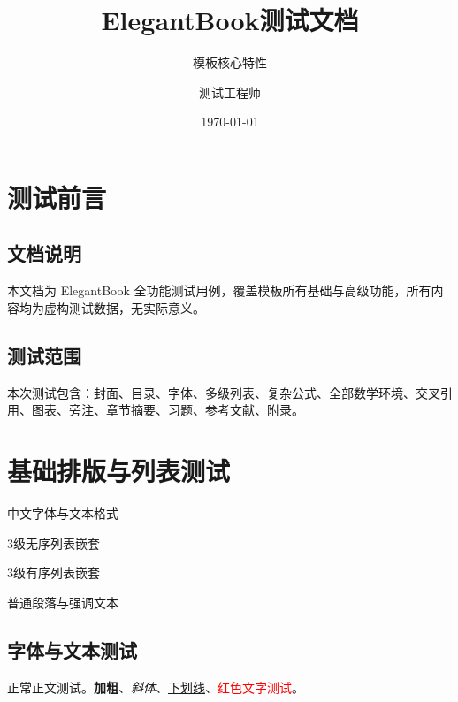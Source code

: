 \title{ElegantBook测试文档}
\subtitle{模板核心特性}
\author{测试工程师}
\date{\today}

\setcounter{tocdepth}{3} %





\maketitle
\frontmatter
\tableofcontents

\setcounter{page}{0}
\chapter*{测试前言}
\section*{文档说明}
本文档为 ElegantBook 全功能测试用例，覆盖模板所有基础与高级功能，所有内容均为虚构测试数据，无实际意义。
\newpage
\section*{测试范围}
本次测试包含：封面、目录、字体、多级列表、复杂公式、全部数学环境、交叉引用、图表、旁注、章节摘要、习题、参考文献、附录。

\mainmatter

\chapter{基础排版与列表测试}
\begin{introduction}[本章测试项]
\item 中文字体与文本格式
\item 3级无序列表嵌套
\item 3级有序列表嵌套
\item 普通段落与强调文本
\end{introduction}

\section{字体与文本测试}
正常正文测试。\textbf{加粗}、\textit{斜体}、\underline{下划线}、\textcolor{red}{红色文字测试}。

